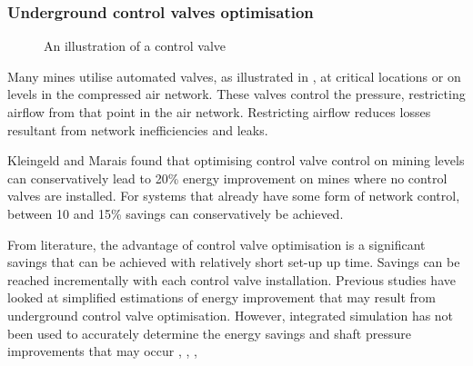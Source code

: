 		 \subsubsection{Underground control valves optimisation}
		 
		 \begin{figure}[h]
		 	\centering
		 	\caption[An illustration of a control valve]{ An illustration of a control valve \cite{Kriel2014Masters}}
		 	\label{fig: Control Valve Illustration}
		 \end{figure}
		 Many mines utilise automated valves, as illustrated in , at critical locations or on levels in the compressed air network. These valves control the pressure, restricting airflow from that point in the air network. Restricting airflow reduces losses resultant from network inefficiencies and leaks.
		 \par 
		 Kleingeld and Marais \cite{kleingeld2010high} found that optimising control valve control on mining levels can conservatively lead to 20\% energy improvement on mines where no control valves are installed. For systems that already have some form of network control, between 10 and 15\% savings can conservatively be achieved.
		 \par 
		 From literature, the advantage of control valve optimisation is a significant savings that can be achieved with relatively short set-up up time. Savings can be reached incrementally with each control valve installation. Previous studies have looked at simplified estimations of energy improvement that may result from underground control valve optimisation. However, integrated simulation has not been used to accurately determine the energy savings and shaft pressure improvements that may occur \cite{kleingeld2010high}, \cite{marais2009increased}, \cite{Neser2008}, \cite{schroeder2009energy} %
